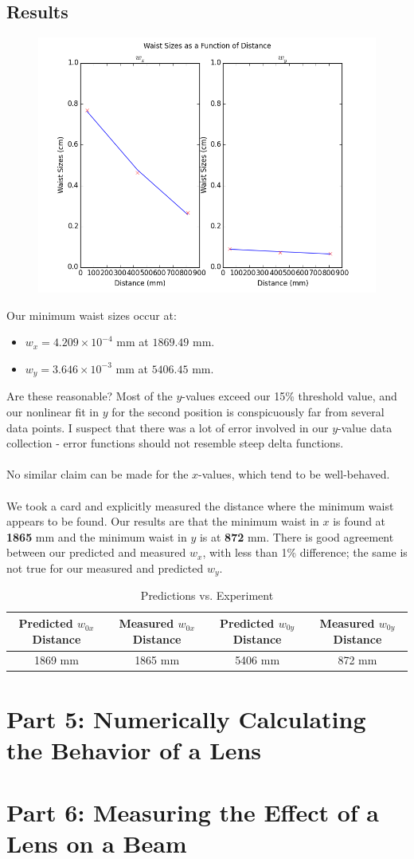 \documentclass[10pt,a4paper]{article}
\begin{document}
\subsection*{Results}
\begin{figure}[H]
\centering
\includegraphics[width = \textwidth]{../Analysis/figure_4.png} 
\end{figure}
Our minimum waist sizes occur at:
\begin{itemize}
\item $w_{x} = 4.209\times 10^{-4}$ mm at $1869.49$ mm.
\item $w_{y} = 3.646\times 10^{-3}$ mm at $5406.45$ mm.
\end{itemize}
Are these reasonable? Most of the $y$-values exceed our 15\% threshold value, and our nonlinear  fit in $y$ for the second position is conspicuously far from several data points. I suspect that there was a lot of error involved in our $y$-value data collection - error functions should not resemble steep delta functions.\\
\\
No similar claim can be made for the $x$-values, which tend to be well-behaved.\\
\\
We took a card and explicitly measured the distance where the minimum waist appears to be found. Our results are that the minimum waist in $x$ is found at \textbf{1865} mm and the minimum waist in $y$ is at \textbf{872} mm. There is good agreement between our predicted and measured $w_{x}$, with less than 1\% difference; the same is not true for our measured and predicted $w_{y}$.
\begin{table}
\centering
\begin{tabular}{cccc}
\hline 
Predicted $w_{0x}$ Distance & Measured $w_{0x}$ Distance & Predicted $w_{0y}$ Distance & Measured $w_{0y}$ Distance \\ 
\hline 
1869 mm & 1865 mm & 5406 mm & 872 mm \\ 
\hline 
\end{tabular}
\caption{Predictions vs. Experiment} 
\end{table}
\section*{Part 5: Numerically Calculating the Behavior of a Lens}
\section*{Part 6: Measuring the Effect of a Lens on a Beam}
\end{document}
